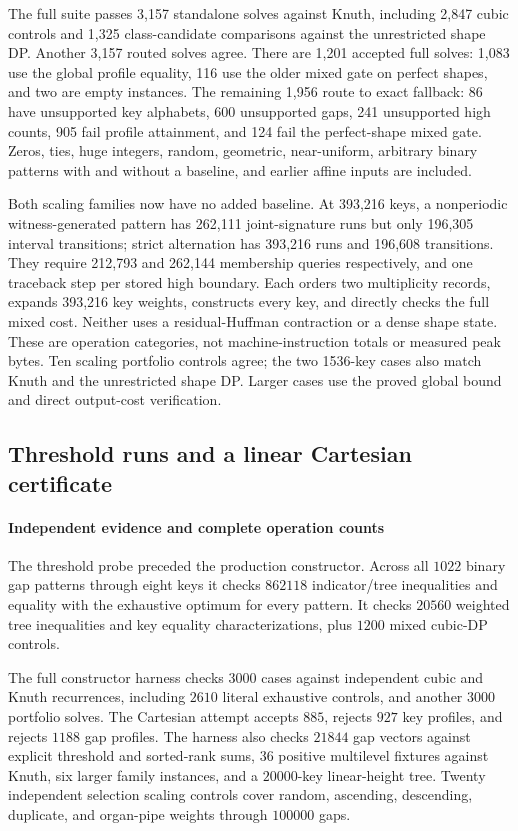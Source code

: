 \documentclass[11pt]{article}
\begin{document}
The full suite passes 3,157 standalone solves against Knuth, including
2,847 cubic controls and 1,325 class-candidate comparisons against the
unrestricted shape DP. Another 3,157 routed solves agree. There are 1,201
accepted full solves: 1,083 use the global profile equality, 116 use the
older mixed gate on perfect shapes, and two are empty instances.
The remaining 1,956 route to exact fallback: 86 have unsupported key
alphabets, 600 unsupported gaps, 241 unsupported high counts, 905 fail
profile attainment, and 124 fail the perfect-shape mixed gate.
Zeros, ties, huge integers, random, geometric, near-uniform, arbitrary
binary patterns with and without a baseline, and earlier affine inputs
are included.

Both scaling families now have no added baseline. At 393,216 keys,
a nonperiodic witness-generated pattern has 262,111 joint-signature runs
but only 196,305 interval transitions; strict alternation has 393,216 runs
and 196,608 transitions. They require 212,793 and 262,144 membership
queries respectively, and one traceback step per stored high boundary.
Each orders two multiplicity records, expands 393,216 key weights,
constructs every key, and directly checks the full mixed cost. Neither
uses a residual-Huffman contraction or a dense shape state. These are
operation categories, not machine-instruction totals or measured peak bytes.
Ten scaling portfolio controls agree; the two 1536-key cases also match
Knuth and the unrestricted shape DP. Larger cases use the proved global
bound and direct output-cost verification.



\subsection{Threshold runs and a linear Cartesian certificate}
\paragraph{Independent evidence and complete operation counts}\label{sec:legacy-25-5}
The threshold probe preceded the production constructor. Across all
$1022$ binary gap patterns through eight keys it checks $862118$
indicator/tree inequalities and equality with the exhaustive optimum
for every pattern. It checks $20560$ weighted tree inequalities and key
equality characterizations, plus $1200$ mixed cubic-DP controls.

The full constructor harness checks $3000$ cases against independent
cubic and Knuth recurrences, including $2610$ literal exhaustive controls,
and another $3000$ portfolio solves. The Cartesian attempt accepts $885$,
rejects $927$ key profiles, and rejects $1188$ gap profiles. The harness
also checks $21844$ gap vectors against explicit threshold and sorted-rank
sums, $36$ positive multilevel fixtures against Knuth, six larger family
instances, and a $20000$-key linear-height tree. Twenty independent
selection scaling controls cover random, ascending, descending, duplicate,
and organ-pipe weights through $100000$ gaps.
\end{document}
